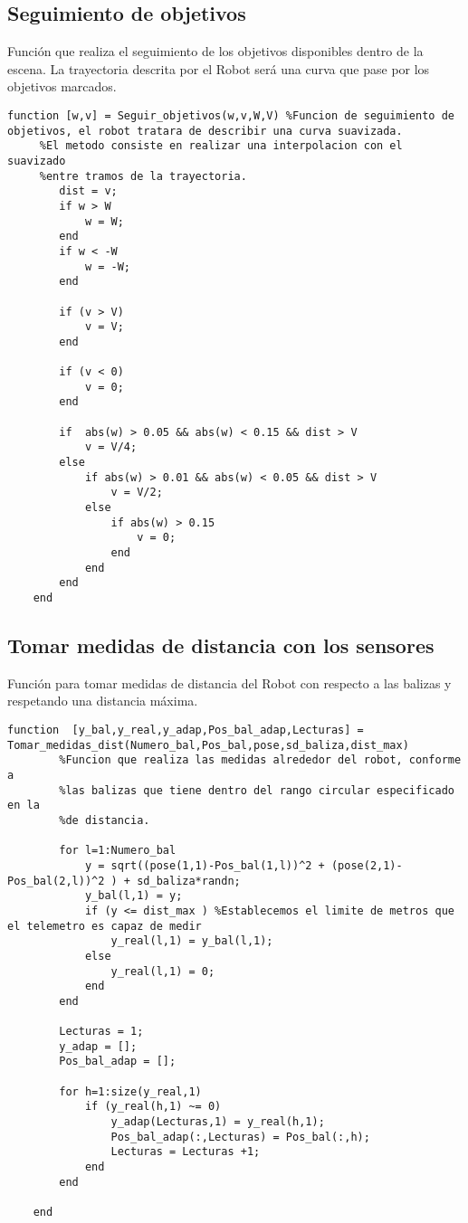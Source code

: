 \subsection{Seguimiento de objetivos}
Función que realiza el seguimiento de los objetivos disponibles dentro de la escena.
La trayectoria descrita por el Robot será una curva que pase por los objetivos marcados.
\begin{lstlisting}[frame=single]
function [w,v] = Seguir_objetivos(w,v,W,V) %Funcion de seguimiento de objetivos, el robot tratara de describir una curva suavizada.
     %El metodo consiste en realizar una interpolacion con el suavizado
     %entre tramos de la trayectoria.
        dist = v;
        if w > W
            w = W;
        end
        if w < -W
            w = -W;
        end 

        if (v > V)
            v = V;
        end

        if (v < 0)
            v = 0;
        end

        if  abs(w) > 0.05 && abs(w) < 0.15 && dist > V
            v = V/4;
        else
            if abs(w) > 0.01 && abs(w) < 0.05 && dist > V
                v = V/2;
            else
                if abs(w) > 0.15
                    v = 0;
                end
            end
        end
    end
\end{lstlisting}
\subsection{Tomar medidas de distancia con los sensores}
Función para tomar medidas de distancia del Robot con respecto a las balizas y respetando una distancia máxima.
\begin{lstlisting}[frame=single]
function  [y_bal,y_real,y_adap,Pos_bal_adap,Lecturas] = Tomar_medidas_dist(Numero_bal,Pos_bal,pose,sd_baliza,dist_max)
        %Funcion que realiza las medidas alrededor del robot, conforme a
        %las balizas que tiene dentro del rango circular especificado en la
        %de distancia.
        
        for l=1:Numero_bal
            y = sqrt((pose(1,1)-Pos_bal(1,l))^2 + (pose(2,1)-Pos_bal(2,l))^2 ) + sd_baliza*randn;
            y_bal(l,1) = y;
            if (y <= dist_max ) %Establecemos el limite de metros que el telemetro es capaz de medir
                y_real(l,1) = y_bal(l,1);
            else
                y_real(l,1) = 0;
            end
        end
        
        Lecturas = 1;
        y_adap = [];
        Pos_bal_adap = [];
        
        for h=1:size(y_real,1)
            if (y_real(h,1) ~= 0)
                y_adap(Lecturas,1) = y_real(h,1);
                Pos_bal_adap(:,Lecturas) = Pos_bal(:,h);
                Lecturas = Lecturas +1;
            end
        end
            
    end
\end{lstlisting}
